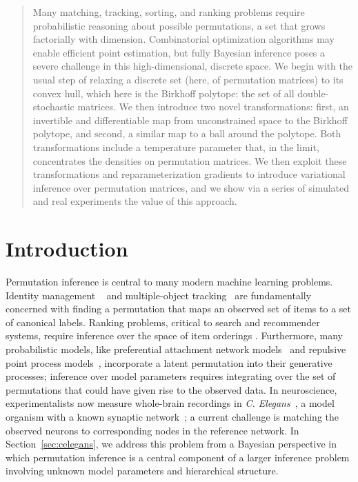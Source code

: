 \documentclass[twoside]{article}
\begin{document}
\begin{abstract}
  Many matching, tracking, sorting, and ranking problems require
  probabilistic reasoning about possible permutations, a set that
  grows factorially with dimension. Combinatorial optimization
  algorithms may enable efficient point estimation, but fully Bayesian
  inference poses a severe challenge in this high-dimensional,
  discrete space.  We begin with the usual step of relaxing a discrete
  set (here, of permutation matrices) to its convex hull, which here
  is the Birkhoff polytope: the set of all double-stochastic matrices.
  We then introduce two novel transformations: first, an invertible
  and differentiable map from unconstrained space to the Birkhoff
  polytope, and second, a similar map to a ball around the polytope.
  Both transformations include a temperature parameter that, in the
  limit, concentrates the densities on permutation matrices.  We then
  exploit these transformations and reparameterization gradients to
  introduce variational inference over permutation matrices, and we
  show via a series of simulated and real experiments the value of
  this approach.
\end{abstract}


\section{Introduction}

Permutation inference is central to many modern machine learning
problems.  Identity management ~\citep{guibas2008identity} and
multiple-object tracking~\citep{shin2005lazy, kondor2007multi} are
fundamentally concerned with finding a permutation that maps an
observed set of items to a set of canonical labels.  Ranking problems,
critical to search and recommender systems, require inference over the
space of item orderings \citep{meilua2007consensus, lebanon2008non,
  adams2011ranking}.  Furthermore, many probabilistic models, like
preferential attachment network models~\citep{bloem2016random} and
repulsive point process models~\citep{rao2016bayesian}, incorporate a
latent permutation into their generative processes; inference over
model parameters requires integrating over the set of permutations
that could have given rise to the observed data.  In neuroscience,
experimentalists now measure whole-brain recordings in
\textit{C. Elegans}~\citep{Kato2015, nguyen2016whole}, a model
organism with a known synaptic network~\citep{white1986structure}; a
current challenge is matching the observed neurons to corresponding
nodes in the reference network.  In Section~\ref{sec:celegans}, we
address this problem from a Bayesian perspective in which permutation
inference is a central component of a larger inference problem involving
unknown model parameters and hierarchical structure.
\end{document}
